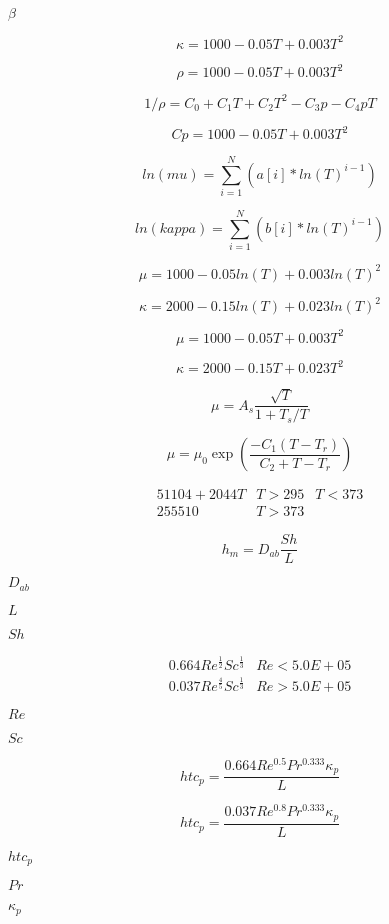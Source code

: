 \documentclass{article}
\begin{document}
$\beta$
\pagebreak

\[ \kappa = 1000 - 0.05 T + 0.003 T^2 \]
\pagebreak

\[ \rho = 1000 - 0.05 T + 0.003 T^2 \]
\pagebreak

\[ 1/\rho = C_0 + C_1 T + C_2 T^2 - C_3 p - C_4 p T \]
\pagebreak

\[ Cp = 1000 - 0.05 T + 0.003 T^2 \]
\pagebreak

\[ ln(mu) = \sum_{i=1}^N \left( a[i] * ln(T)^{i-1} \right) \]
\pagebreak

\[ ln(kappa) = \sum_{i=1}^N \left( b[i] * ln(T)^{i-1} \right) \]
\pagebreak

\[ \mu = 1000 - 0.05 ln(T) + 0.003 ln(T)^2 \]
\pagebreak

\[ \kappa = 2000 - 0.15 ln(T) + 0.023 ln(T)^2 \]
\pagebreak

\[ \mu = 1000 - 0.05 T + 0.003 T^2 \]
\pagebreak

\[ \kappa = 2000 - 0.15 T + 0.023 T^2 \]
\pagebreak

\[ \mu = A_s \frac{\sqrt{T}}{1 + T_s / T} \]
\pagebreak

\[ \mu = \mu_0 \exp \left(\frac{-C_1 ( T - T_r )}{C_2 + T - T_r}\right) \]
\pagebreak

\begin{eqnarray*} 51104 + 2044 T & T > 295 & T < 373 \\ 255510 & T > 373 & \end{eqnarray*}
\pagebreak

\[ h_m = D_{ab} \frac{Sh}{L} \]
\pagebreak

$ D_{ab} $
\pagebreak

$ L $
\pagebreak

$ Sh $
\pagebreak

\begin{eqnarray*} 0.664 Re^\frac{1}{2} Sc^\frac{1}{3} & Re < 5.0E+05 \\ 0.037 Re^\frac{4}{5} Sc^\frac{1}{3} & Re > 5.0E+05 \end{eqnarray*}
\pagebreak

$ Re $
\pagebreak

$ Sc $
\pagebreak

\[ htc_p = \frac{0.664 Re^{0.5} Pr^{0.333} \kappa_p}{L} \]
\pagebreak

\[ htc_p = \frac{0.037 Re^{0.8} Pr^{0.333} \kappa_p}{L} \]
\pagebreak

$ htc_p $
\pagebreak

$ Pr $
\pagebreak

$ \kappa_p $
\pagebreak
\end{document}
